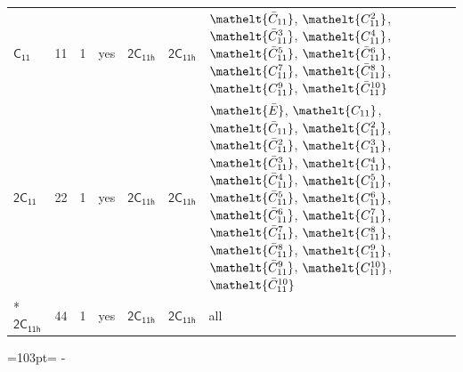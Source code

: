 \documentclass[10pt,a4paper]{article}
\newcommand{\needspace}[1]{\par\penalty-100\begingroup\dimen0=#1\relax\dimen2=\pagegoal
  \advance\dimen2-\pagetotal\ifdim\dimen0>\dimen2\relax\ifdim\dimen2>0pt\vfil\break\fi\fi
  \endgroup}
\numberwithin{equation}{section}
\newcommand{\eltfont}[1]{{\let\sigma\eltsigma\mathelt{#1}}}
\newcommand{\grp}[1]{\mathsf{#1}}
\newcommand{\cls}[1]{\eltfont{#1}}
\newcommand{\barred}[1]{\bar{#1}}
\newlength{\fillwidth}\newlength{\cellwidth}\newlength{\colwidth}
\begin{document}
{\begin{longtable}{@{}lrrlll>{\RaggedRight\arraybackslash}p{\fillwidth}@{}}
\href{C11.pdf}{$\grp{C_{11}}$} & 11 & 1 & yes & \href{2C11h.pdf}{$\grp{2C_{11h}}$} & \href{2C11h.pdf}{$\grp{2C_{11h}}$} & $\cls{\barred{C}_{11}}$, $\cls{C_{11}^{2}}$, $\cls{\barred{C}_{11}^{3}}$, $\cls{C_{11}^{4}}$, $\cls{\barred{C}_{11}^{5}}$, $\cls{\barred{C}_{11}^{6}}$, $\cls{C_{11}^{7}}$, $\cls{\barred{C}_{11}^{8}}$, $\cls{C_{11}^{9}}$, $\cls{\barred{C}_{11}^{10}}$\\
\href{2C11.pdf}{$\grp{2C_{11}}$} & 22 & 1 & yes & \href{2C11h.pdf}{$\grp{2C_{11h}}$} & \href{2C11h.pdf}{$\grp{2C_{11h}}$} & $\cls{\barred{E}}$, $\cls{C_{11}}$, $\cls{\barred{C}_{11}}$, $\cls{C_{11}^{2}}$, $\cls{\barred{C}_{11}^{2}}$, $\cls{C_{11}^{3}}$, $\cls{\barred{C}_{11}^{3}}$, $\cls{C_{11}^{4}}$, $\cls{\barred{C}_{11}^{4}}$, $\cls{C_{11}^{5}}$, $\cls{\barred{C}_{11}^{5}}$, $\cls{C_{11}^{6}}$, $\cls{\barred{C}_{11}^{6}}$, $\cls{C_{11}^{7}}$, $\cls{\barred{C}_{11}^{7}}$, $\cls{C_{11}^{8}}$, $\cls{\barred{C}_{11}^{8}}$, $\cls{C_{11}^{9}}$, $\cls{\barred{C}_{11}^{9}}$, $\cls{C_{11}^{10}}$, $\cls{\barred{C}_{11}^{10}}$\\*
\href{2C11h.pdf}{$\grp{2C_{11h}}$} & 44 & 1 & yes & \href{2C11h.pdf}{$\grp{2C_{11h}}$} & \href{2C11h.pdf}{$\grp{2C_{11h}}$} & all\\
\bottomrule\end{longtable}}
\needspace{103pt}
\end{document}
